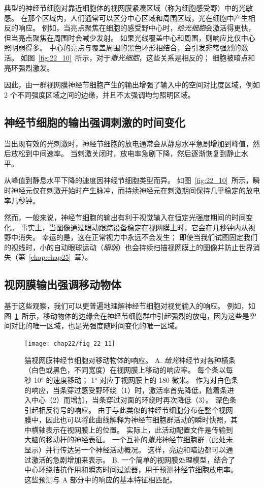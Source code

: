 典型的神经节细胞对靠近细胞体的视网膜紧凑区域（称为细胞感受野）中的光敏感。
在那个区域内，人们通常可以区分中心区域和周围区域，光在细胞中产生相反的响应。
例如，当亮点聚焦在细胞的感受野中心时，\textit{给光细胞}会激活得更快，但当亮点聚焦在周围时会减少发射。
如果光线覆盖中心和周围，则响应比仅中心照明弱得多。 
中心的亮点与覆盖周围的黑色环形相结合，会引发非常强烈的激活。
如图~\ref{fig:22_10}~所示，对于\textit{撤光细胞}，这些关系是相反的；
细胞被暗点和亮环强烈激发。



因此，由一群视网膜神经节细胞产生的输出增强了输入中的空间对比度区域，例如 2 个不同强度区域之间的边缘，并且不太强调均匀照明区域。



\subsection{神经节细胞的输出强调刺激的时间变化}

当出现有效的光刺激时，神经节细胞的放电通常会从静息水平急剧增加到峰值，然后放松到中间速率。
当刺激关闭时，放电率急剧下降，然后逐渐恢复到静止水平。


从峰值到静息水平下降的速度因神经节细胞类型而异。
如图~\ref{fig:22_10}~所示，瞬时神经元仅在刺激开始时产生脉冲，而持续神经元在刺激期间保持几乎稳定的放电率几秒钟。


然而，一般来说，神经节细胞的输出有利于视觉输入在恒定光强度期间的时间变化。
事实上，当图像通过眼动跟踪设备稳定在视网膜上时，它会在几秒钟内从视野中消失。
幸运的是，这在正常视力中永远不会发生；
即使当我们试图固定我们的视线时，小的自动眼球运动（\textit{眼跳}）也会持续扫描视网膜上的图像并防止世界消失（第~\ref{chap:chap25}~章）。



\subsection{视网膜输出强调移动物体}

基于这些观察，我们可以更普遍地理解神经节细胞对视觉输入的响应。
例如，如图~\ref{fig:22_11}~所示，移动物体的边缘会在神经节细胞群中引起强烈的放电，因为这些是空间对比的唯一区域，也是光强度随时间变化的唯一区域。


\begin{figure}[htbp]
	\centering
	\texttt{[image: chap22/fig\_22\_11]}
	\caption{猫视网膜神经节细胞对移动物体的响应。 
		A. \textit{给光}神经节对各种横条（白色或黑色，不同宽度）在视网膜上移动的响应率。 
		每个条以每秒 10° 的速度移动； 1° 对应于视网膜上的 180 微米。
		作为对白色条的响应，当条穿过感受野环绕（1）时，激活率首先降低，随着条进入中心（2）而增加，当条穿过对面的环绕时再次降低（3）。
		深色条引起相反符号的响应。 
		由于与此类似的神经节细胞分布在整个视网膜中，因此也可以将此曲线解释为神经节细胞群活动的瞬时快照，其中横轴表示在视网膜上的位置。 
		实际上，此活动配置文件是传输到大脑的移动杆的神经表征。 
		一个互补的\textit{撤光}神经节细胞群（此处未显示）并行传达另一个神经活动概况。 这样，亮边和暗边都可以通过激活的急剧增加来表示。 
		B. 一个简单的视网膜处理模型，结合了中心环绕拮抗作用和瞬态时间过滤器，用于预测神经节细胞放电率。 
		这些预测与 A 部分中的响应的基本特征相匹配。}
	\label{fig:22_11}
\end{figure}


